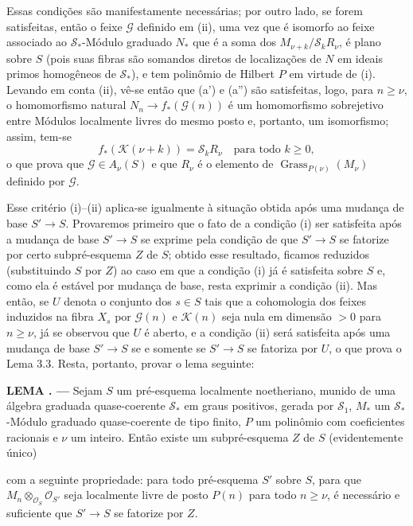 \documentclass[11pt,twoside,openany]{book}
\numberwithin{equation}{section}
\newcommand{\src}[1]{%
  \phantomsection\hypertarget{src:#1}{}%
  \marginpar{\raggedleft\footnotesize\sffamily #1}%
}
\theoremstyle{plain}
\theoremstyle{definition}
\theoremstyle{remark}
\newcommand{\result}[2]{%
  \par\medskip\noindent\textbf{#1%
  \if\relax\detokenize{#2}\relax\else\space#2\fi. ---}\enspace
}
\newcommand{\FgaUnitKey}{frontmatter}
\renewcommand{\src}[1]{%
  \phantomsection\hypertarget{src:\FgaUnitKey:#1}{}%
  \marginpar{\raggedleft\footnotesize\sffamily #1}%
}
\begin{document}
Essas condições são manifestamente necessárias; por outro lado, se forem
satisfeitas, então o feixe $\mathcal G$ definido em (ii), uma vez que é
isomorfo ao feixe associado ao $\mathcal S_*$-Módulo graduado $N_*$ que é a
soma dos $M_{\nu+k}/\mathcal S_kR_\nu$, é plano sobre $S$ (pois suas fibras
são somandos diretos de localizações de $N$ em ideais primos homogêneos de
$\mathcal S_*$), e tem polinômio de Hilbert $P$ em virtude de (i). Levando em
conta (ii), vê-se então que (a') e (a'') são satisfeitas, logo, para
$n\geq\nu$, o homomorfismo natural $N_n\longrightarrow f_*(\mathcal G(n))$ é
um homomorfismo sobrejetivo entre Módulos localmente livres do mesmo posto e,
portanto, um isomorfismo; assim, tem-se
\[
f_*(\mathcal K(\nu+k))=\mathcal S_kR_\nu
\quad\text{para todo $k\geq0$},
\]
o que prova que $\mathcal G\in A_\nu(S)$ e que $R_\nu$ é o elemento de
$\operatorname{Grass}_{P(\nu)}(M_\nu)$ definido por $\mathcal G$.

Esse critério (i)--(ii) aplica-se igualmente à situação obtida após uma
mudança de base $S'\longrightarrow S$. Provaremos primeiro que o fato de a
condição (i) ser satisfeita após a mudança de base $S'\longrightarrow S$ se
exprime pela condição de que $S'\longrightarrow S$ se fatorize por certo
subpré-esquema $Z$ de $S$; obtido esse resultado, ficamos reduzidos
(substituindo $S$ por $Z$) ao caso em que a condição (i) já é satisfeita sobre
$S$ e, como ela é estável por mudança de base, resta exprimir a condição (ii).
Mas então, se $U$ denota o conjunto dos $s\in S$ tais que a cohomologia dos
feixes induzidos na fibra $X_s$ por $\mathcal G(n)$ e $\mathcal K(n)$ seja nula
em dimensão $>0$ para $n\geq\nu$, já se observou que $U$ é aberto, e a condição
(ii) será satisfeita após uma mudança de base $S'\longrightarrow S$ se e somente
se $S'\longrightarrow S$ se fatoriza por $U$, o que prova o Lema 3.3. Resta,
portanto, provar o lema seguinte:

\result{LEMA}{3.4} Sejam $S$ um pré-esquema localmente noetheriano, munido de
uma álgebra graduada quase-coerente $\mathcal S_*$ em graus positivos, gerada
por $\mathcal S_1$, $M_*$ um $\mathcal S_*$-Módulo graduado quase-coerente de tipo
finito, $P$ um polinômio com coeficientes racionais e $\nu$ um inteiro. Então
existe um subpré-esquema $Z$ de $S$ (evidentemente único)
\src{263}
com a seguinte propriedade: para todo pré-esquema $S'$ sobre $S$, para que
$M_n\otimes_{\mathcal O_S}\mathcal O_{S'}$ seja localmente livre de posto
$P(n)$ para todo $n\geq\nu$, é necessário e suficiente que
$S'\longrightarrow S$ se fatorize por $Z$.
\end{document}
